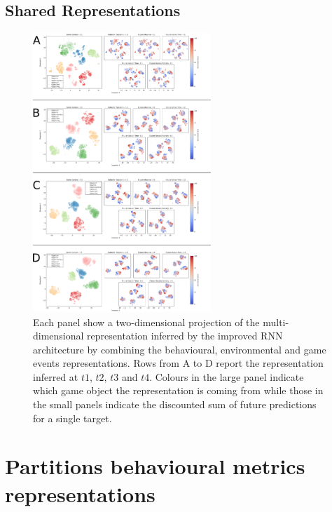 \subsection{Shared Representations}
\begin{figure}[!htb]
\includegraphics[width=0.6\textwidth]{images/appendix_D/rnn_full_state_umap.png}
\centering
\caption[\textbf{Lower dimensional representation of the shared latent representations generated by the improved RNN architecture}]{Each panel show a two-dimensional projection of the multi-dimensional representation inferred by the improved RNN architecture by combining the behavioural, environmental and game events representations. Rows from A to D report the representation inferred at $t1$, $t2$, $t3$ and $t4$. Colours in the large panel indicate which game object the representation is coming from while those in the small panels indicate the discounted sum of future predictions for a single target.}
\end{figure}
\FloatBarrier

\section{Partitions behavioural metrics representations}
\label{partitions_behavioural}

